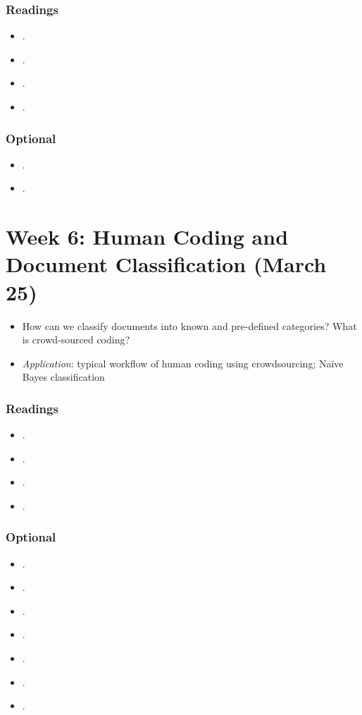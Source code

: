 \documentclass[abstract=on,parskip=full,headings=standardclasses,fontsize=11pt,paper=a4]{scrartcl}
\begin{document}
\subsubsection*{Readings}
\begin{itemize}
\item {}.
\item {}.
\item {}.
\item {}.
\end{itemize}

\subsubsection*{Optional}
\begin{itemize}
\item {}.
\item {}.
\end{itemize}


\section{Week 6: Human Coding and Document Classification (March 25)}

\begin{itemize}
\renewcommand\labelitemi{--}
\item How can we classify documents into known and pre-defined categories? What is crowd-sourced coding?
\item \textit{Application}: typical workflow of human coding using crowdsourcing; Naïve Bayes classification
\end{itemize}

\subsubsection*{Readings}
\begin{itemize}
\item {}.
\item {}.
\item {}.
\item {}.
\end{itemize}

\subsubsection*{Optional}
\begin{itemize}
\item {}.
\item {}.
\item {}.
\item {}.
\item {}.
\item {}.
\item {}.
\end{itemize}
\end{document}
